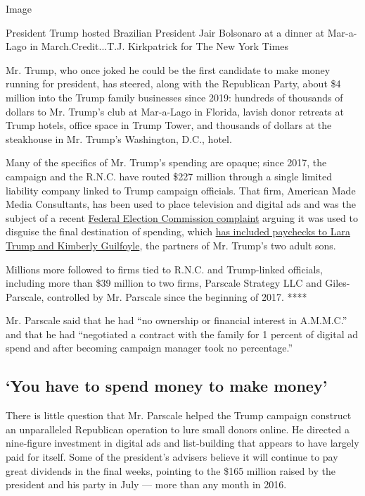 Image

President Trump hosted Brazilian President Jair Bolsonaro at a dinner at
Mar-a-Lago in March.Credit...T.J. Kirkpatrick for The New York Times

Mr. Trump, who once joked he could be the first candidate to make money
running for president, has steered, along with the Republican Party,
about \$4 million into the Trump family businesses since 2019: hundreds
of thousands of dollars to Mr. Trump's club at Mar-a-Lago in Florida,
lavish donor retreats at Trump hotels, office space in Trump Tower, and
thousands of dollars at the steakhouse in Mr. Trump's Washington, D.C.,
hotel.

Many of the specifics of Mr. Trump's spending are opaque; since 2017,
the campaign and the R.N.C. have routed \$227 million through a single
limited liability company linked to Trump campaign officials. That firm,
American Made Media Consultants, has been used to place television and
digital ads and was the subject of a recent
\href{https://www.courthousenews.com/wp-content/uploads/2020/07/FEC-trump-complaint.pdf}{Federal
Election Commission complaint} arguing it was used to disguise the final
destination of spending, which
\href{https://www.nytimes3xbfgragh.onion/2020/03/09/us/trump-campaign-brad-parscale.html}{has
included paychecks to Lara Trump and Kimberly Guilfoyle}, the partners
of Mr. Trump's two adult sons.

Millions more followed to firms tied to R.N.C. and Trump-linked
officials, including more than \$39 million to two firms, Parscale
Strategy LLC and Giles-Parscale, controlled by Mr. Parscale since the
beginning of 2017. ****

Mr. Parscale said that he had ``no ownership or financial interest in
A.M.M.C.'' and that he had ``negotiated a contract with the family for 1
percent of digital ad spend and after becoming campaign manager took no
percentage.''

\hypertarget{you-have-to-spend-money-to-make-money}{%
\subsection{`You have to spend money to make
money'}\label{you-have-to-spend-money-to-make-money}}

There is little question that Mr. Parscale helped the Trump campaign
construct an unparalleled Republican operation to lure small donors
online. He directed a nine-figure investment in digital ads and
list-building that appears to have largely paid for itself. Some of the
president's advisers believe it will continue to pay great dividends in
the final weeks, pointing to the \$165 million raised by the president
and his party in July --- more than any month in 2016.

